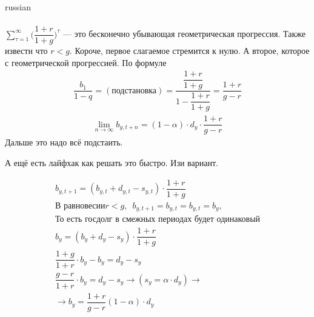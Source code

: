 \documentclass{article}
\begin{document}
\begin{otherlanguage*}{russian}
\begin{enumerate}
\begin{align*}
\end{align*}
$  \sum_{\tau = 1}^\infty \Big( \dfrac{1 + r}{1 + g} \Big) ^ \tau  $ --- 
это бесконечно убывающая геометрическая прогрессия. Также известн что $ r < g $. Короче, первое слагаемое стремится к нулю. А второе, которое с геометрической прогрессией. По формуле
\begin{align*}
\dfrac{b_1}{1 - q} = (\text{подстановка} )= \dfrac{\dfrac{1 + r}{1 + g}}{1 - \dfrac{1 + r}{1 + g}} = \dfrac{1 + r}{g- r}
\end{align*}
\begin{align*}
\lim_{n \rightarrow \infty} b_{y, t + n} = (1 - \alpha ) \cdot d_y \cdot \dfrac{1 + r}{g - r} 
\end{align*}
Дальше это надо всё подстаить. 

А ещё есть лайфхак как решать это быстро. Изи вариант. 

\begin{align*}
b_{y, t+1} = (b_{y, t} + d_{y, t} - s_{y, t}) \cdot \dfrac{1 + r}{1 + g} \\
\text{В равновесии} r < g, \,\,\, b_{y, t+1} = b_{y, t} = b_{y, t} = b_y, \\ \text{То есть госдолг в смежных периодах будет одинаковый} \\
b_y = (b_y + d_y - s_y) \cdot \dfrac{1 + r}{1 + g} \\
\dfrac{1 + g}{1 + r} \cdot b_y - b_y = d_y - s_y \\
\dfrac{g - r}{1 + r} \cdot b_y = d_y - s_y \rightarrow (s_y = \alpha \cdot d_y) \rightarrow \\
\rightarrow b_y = \dfrac{1 + r}{g - r} (1 - \alpha) \cdot d_y
\end{align*}


\end{enumerate}
\end{otherlanguage*}
\end{document}

